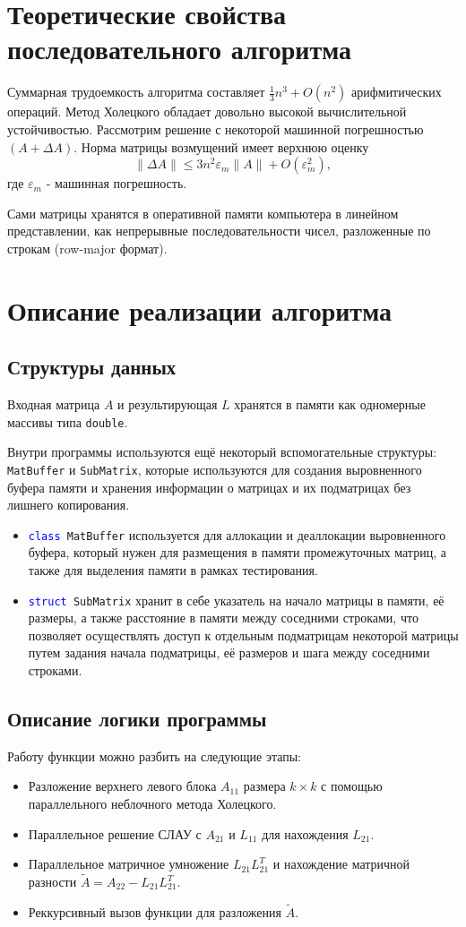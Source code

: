 \documentclass[11pt, a4paper]{article}
\def\newsection#1{
    \section{#1}
}
\def\newsubsection#1{
    \subsection{#1}
}
\begin{document}
\newsection{Теоретические свойства последовательного алгоритма}
Суммарная трудоемкость алгоритма составляет $\frac{1}{3}n^3 + O(n^2)$ арифмитических операций. Метод Холецкого обладает
довольно высокой вычислительной устойчивостью. Рассмотрим решение с некоторой машинной погрешностью $(A + \Delta A)$. Норма матрицы
возмущений имеет верхнюю оценку
\[
    \| \Delta A \| \leqslant 3n^2\varepsilon_m \|A\| + O(\varepsilon_m^2),
\]
где $\varepsilon_m$ - машинная погрешность.

Сами матрицы хранятся в оперативной памяти компьютера в линейном представлении, как непрерывные последовательности чисел,
разложенные по строкам (row-major формат).

\newsection{Описание реализации алгоритма}
\newsubsection{Структуры данных}
Входная матрица $A$ и результирующая $L$ хранятся в памяти как одномерные массивы типа \texttt{double}.


Внутри программы используются ещё некоторый вспомогательные структуры: \texttt{MatBuffer} и \texttt{SubMatrix}, которые
используются для создания выровненного буфера памяти и хранения информации о матрицах и их подматрицах без лишнего копирования.
\begin{itemize}
    \item \texttt{\textcolor{blue}{class} MatBuffer} используется для аллокации и деаллокации выровненного буфера, который нужен для размещения в памяти
        промежуточных матриц, а также для выделения памяти в рамках тестирования.
    \item \texttt{\textcolor{blue}{struct} SubMatrix} хранит в себе указатель на начало матрицы в памяти, её размеры, а также расстояние в памяти между соседними строками,
        что позволяет осуществлять доступ к отдельным подматрицам некоторой матрицы путем задания начала подматрицы, её размеров и шага между соседними строками.
\end{itemize}


\newsubsection{Описание логики программы}
Работу функции можно разбить на следующие этапы:
\begin{itemize}
    \item [\textbf{1.}] Разложение верхнего левого блока $A_{11}$ размера $k \times k$ с помощью параллельного неблочного метода Холецкого.
    \item [\textbf{2.}] Параллельное решение СЛАУ с $A_{21}$ и $L_{11}$ для нахождения $L_{21}$.
    \item [\textbf{3.}] Параллельное матричное умножение $L_{21}L_{21}^T$ и нахождение матричной разности $\tilde{A} = A_{22} - L_{21}L_{21}^T$.
    \item [\textbf{4.}] Реккурсивный вызов функции для разложения $\tilde{A}$.
\end{itemize}
\end{document}
